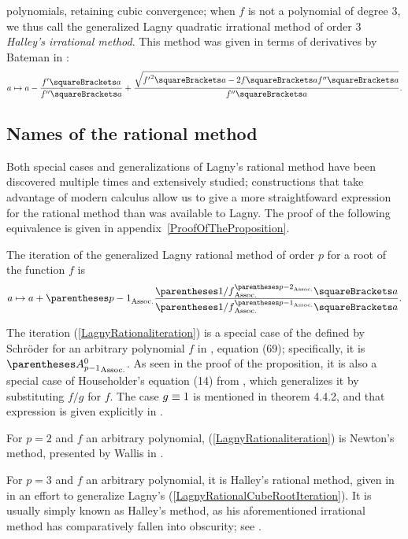 ﻿\documentclass[10pt, a4paper, twoside]{basestyle}
\begin{document}
polynomials, retaining cubic convergence; when $f$ is
not a polynomial of degree $3$, we thus call the generalized Lagny quadratic irrational method of
order $3$ \emph{Halley's irrational method}.
This method was given in terms of derivatives by Bateman in \cite[12]{Bateman1938}:\[
\FunctionBody{a}{a-\frac{f'\of{a}}}{f''\of{a}}+\frac{\sqrt{{f'}^2\of{a}-2f\of{a}f''\of{a}}}{f''\of{a}}\text.
\]

\subsection*{Names of the rational method}
Both special cases and generalizations of Lagny's rational method have been discovered multiple times
and extensively studied; constructions that take advantage of modern calculus allow us to give a more
straightfoward expression for the rational method than was available to Lagny.
The proof of the following equivalence is given in appendix~\ref{ProofOfTheProposition}.
\begin{proposition}
The iteration of the generalized Lagny rational method of order $p$ for a root of the
function $f$ is\begin{equation}
a\mapsto a + \pa{p-1}\frac{\pa{1/f}^{\pa{p-2}}\of{a}}{\pa{1/f}^{\pa{p-1}}\of{a}}\text.\label{LagnyRationaliteration}
\end{equation}
\end{proposition}
The iteration (\ref{LagnyRationaliteration}) is a special case of the  defined by Schröder for an
arbitrary polynomial $f$ in \cite[349\psq]{Schröder1870}, equation (69); specifically, it is $\pa{A^0_{p-1}}$.
As seen in the proof of the proposition, it is also a special case of Householder’s  equation (14) from \cite[169]{Householder1970}, which generalizes it by substituting $f/g$ for $f$. The case
$g\equiv1$ is mentioned in theorem 4.4.2, and that expression is given explicitly in \cite{SebahGourdon2001}.

For $p=2$ and $f$ an arbitrary polynomial, (\ref{LagnyRationaliteration}) is Newton's method, presented by Wallis in
\cite[338]{Wallis1685}.

For $p=3$ and $f$ an arbitrary polynomial, it is Halley's rational method, given in \cite[142--143]{Halley1694} in
an effort to generalize Lagny's (\ref{LagnyRationalCubeRootIteration}).
It is usually simply known as Halley's method, as his aforementioned irrational method has comparatively fallen into obscurity; see \cite{ScavoThoo1995}.
\end{document}
